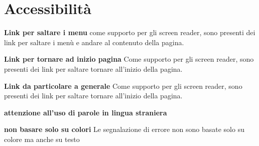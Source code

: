 \documentclass[1_relazione.tex]{subfiles}
\begin{document}
\section{Accessibilità}
\begin{itemize}
\textbf{Link per saltare i menu} come supporto per gli screen reader, sono presenti dei link per saltare i menù e andare al contenuto della pagina.

\textbf{Link per tornare ad inizio pagina} Come supporto per gli screen reader, sono presenti dei link per saltare tornare all'inizio della pagina.

\textbf{Link da particolare a generale} Come supporto per gli screen reader, sono presenti dei link per saltare tornare all'inizio della pagina.

\textbf{attenzione all'uso di parole in lingua straniera}

\textbf{non basare solo su colori} Le segnalazione di errore non sono basate solo su colore ma anche su testo
\end{itemize}
\end{document}
